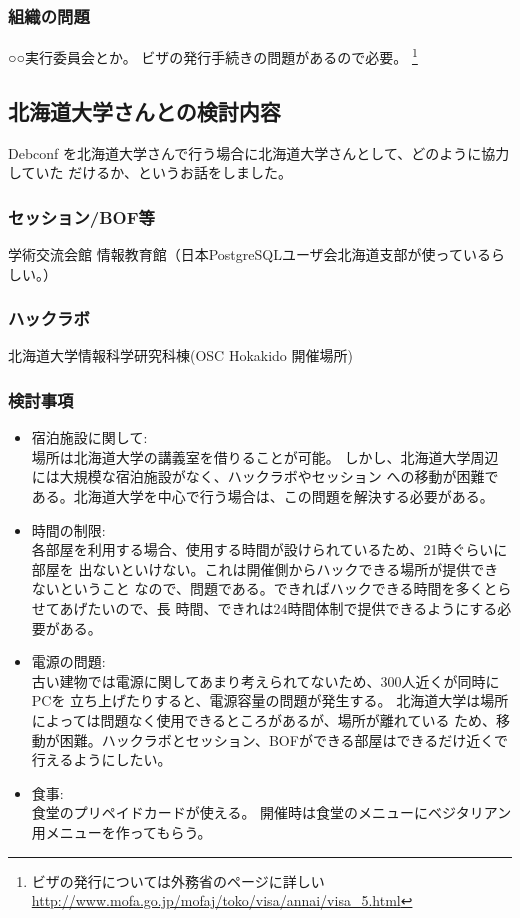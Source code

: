 \documentclass[mingoth,a4paper]{jsarticle}
\begin{document}
\subsubsection{組織の問題}

○○実行委員会とか。
ビザの発行手続きの問題があるので必要。
\footnote{ビザの発行については外務省のページに詳しい 
\url{http://www.mofa.go.jp/mofaj/toko/visa/annai/visa_5.html}}

\subsection{北海道大学さんとの検討内容}

Debconf を北海道大学さんで行う場合に北海道大学さんとして、どのように協力していた
だけるか、というお話をしました。

\subsubsection{セッション/BOF等}
	学術交流会館
	情報教育館（日本PostgreSQLユーザ会北海道支部が使っているらしい。）
	
\subsubsection{ハックラボ}
	北海道大学情報科学研究科棟(OSC Hokakido 開催場所)
	

\subsubsection{検討事項}

\begin{itemize}
 \item  宿泊施設に関して: \\
	場所は北海道大学の講義室を借りることが可能。
	しかし、北海道大学周辺には大規模な宿泊施設がなく、ハックラボやセッション	
	への移動が困難である。北海道大学を中心で行う場合は、この問題を解決する必要がある。

 \item  時間の制限: \\
	各部屋を利用する場合、使用する時間が設けられているため、21時ぐらいに部屋を
	出ないといけない。これは開催側からハックできる場所が提供できないということ
	なので、問題である。できればハックできる時間を多くとらせてあげたいので、長
	時間、できれは24時間体制で提供できるようにする必要がある。

 \item  電源の問題: \\
	古い建物では電源に関してあまり考えられてないため、300人近くが同時にPCを
	立ち上げたりすると、電源容量の問題が発生する。
	北海道大学は場所によっては問題なく使用できるところがあるが、場所が離れている
	ため、移動が困難。ハックラボとセッション、BOFができる部屋はできるだけ近くで
	行えるようにしたい。

 \item  食事: \\
	食堂のプリペイドカードが使える。
	開催時は食堂のメニューにベジタリアン用メニューを作ってもらう。
\end{itemize}
\end{document}
